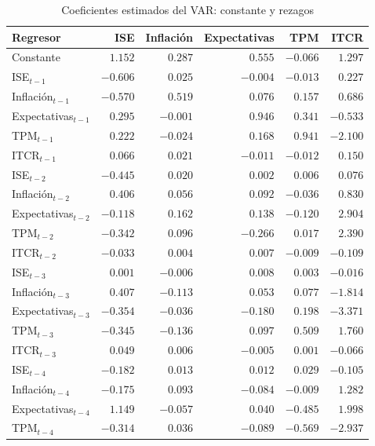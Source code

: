 \begin{table}[H]
\centering
\caption{Coeficientes estimados del VAR: constante y rezagos}
\label{tab:coeficientes}
\footnotesize
\begin{tabular}{@{}lrrrrr@{}}
\toprule
Regresor & ISE & Inflación & Expectativas & TPM & ITCR \\
\midrule
Constante & $1.152$ & $0.287$ & $0.555$ & $-0.066$ & $1.297$ \\
\addlinespace
ISE$_{t-1}$ & $-0.606$ & $0.025$ & $-0.004$ & $-0.013$ & $0.227$ \\
Inflación$_{t-1}$ & $-0.570$ & $0.519$ & $0.076$ & $0.157$ & $0.686$ \\
Expectativas$_{t-1}$ & $0.295$ & $-0.001$ & $0.946$ & $0.341$ & $-0.533$ \\
TPM$_{t-1}$ & $0.222$ & $-0.024$ & $0.168$ & $0.941$ & $-2.100$ \\
ITCR$_{t-1}$ & $0.066$ & $0.021$ & $-0.011$ & $-0.012$ & $0.150$ \\
\addlinespace
ISE$_{t-2}$ & $-0.445$ & $0.020$ & $0.002$ & $0.006$ & $0.076$ \\
Inflación$_{t-2}$ & $0.406$ & $0.056$ & $0.092$ & $-0.036$ & $0.830$ \\
Expectativas$_{t-2}$ & $-0.118$ & $0.162$ & $0.138$ & $-0.120$ & $2.904$ \\
TPM$_{t-2}$ & $-0.342$ & $0.096$ & $-0.266$ & $0.017$ & $2.390$ \\
ITCR$_{t-2}$ & $-0.033$ & $0.004$ & $0.007$ & $-0.009$ & $-0.109$ \\
\addlinespace
ISE$_{t-3}$ & $0.001$ & $-0.006$ & $0.008$ & $0.003$ & $-0.016$ \\
Inflación$_{t-3}$ & $0.407$ & $-0.113$ & $0.053$ & $0.077$ & $-1.814$ \\
Expectativas$_{t-3}$ & $-0.354$ & $-0.036$ & $-0.180$ & $0.198$ & $-3.371$ \\
TPM$_{t-3}$ & $-0.345$ & $-0.136$ & $0.097$ & $0.509$ & $1.760$ \\
ITCR$_{t-3}$ & $0.049$ & $0.006$ & $-0.005$ & $0.001$ & $-0.066$ \\
\addlinespace
ISE$_{t-4}$ & $-0.182$ & $0.013$ & $0.012$ & $0.029$ & $-0.105$ \\
Inflación$_{t-4}$ & $-0.175$ & $0.093$ & $-0.084$ & $-0.009$ & $1.282$ \\
Expectativas$_{t-4}$ & $1.149$ & $-0.057$ & $0.040$ & $-0.485$ & $1.998$ \\
TPM$_{t-4}$ & $-0.314$ & $0.036$ & $-0.089$ & $-0.569$ & $-2.937$ \\

\end{tabular}
\end{table}
